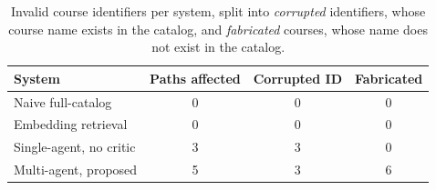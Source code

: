 \begin{table}[t]
\centering
\caption{Invalid course identifiers per system, split into \emph{corrupted} identifiers, whose course name exists in the catalog, and \emph{fabricated} courses, whose name does not exist in the catalog.}
\label{tab:halluc}
\begin{tabular}{lccc}
\hline
System & Paths affected & Corrupted ID & Fabricated \\
\hline
Naive full-catalog & 0 & 0 & 0 \\
Embedding retrieval & 0 & 0 & 0 \\
Single-agent, no critic & 3 & 3 & 0 \\
Multi-agent, proposed & 5 & 3 & 6 \\
\hline
\end{tabular}
\end{table}
